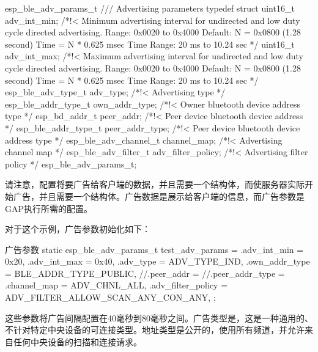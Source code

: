 \documentclass[lang=cn,newtx,10pt,scheme=chinese]{elegantbook}
\begin{document}
\begin{mycode}{esp\_ble\_adv\_params\_t}
/// Advertising parameters
typedef struct {
    uint16_t adv_int_min;
    /*!< Minimum advertising interval for undirected and low duty cycle directed advertising.
                    Range: 0x0020 to 0x4000
                    Default: N = 0x0800 (1.28 second)
                    Time = N * 0.625 msec
                    Time Range: 20 ms to 10.24 sec */
    uint16_t adv_int_max;
    /*!< Maximum advertising interval for undirected and low duty cycle directed advertising.
                    Range: 0x0020 to 0x4000
                    Default: N = 0x0800 (1.28 second)
                    Time = N * 0.625 msec
                    Time Range: 20 ms to 10.24 sec */
    esp_ble_adv_type_t adv_type;            /*!< Advertising type */
    esp_ble_addr_type_t own_addr_type;      /*!< Owner bluetooth device address type */
    esp_bd_addr_t peer_addr;                /*!< Peer device bluetooth device address */
    esp_ble_addr_type_t peer_addr_type;     /*!< Peer device bluetooth device address type */
    esp_ble_adv_channel_t channel_map;      /*!< Advertising channel map */
    esp_ble_adv_filter_t adv_filter_policy; /*!< Advertising filter policy */
}
esp_ble_adv_params_t;
\end{mycode}

请注意，配置将要广告给客户端的数据，并且需要一个结构体，而使服务器实际开始广告，并且需要一个结构体。广告数据是展示给客户端的信息，而广告参数是GAP执行所需的配置。

对于这个示例，广告参数初始化如下：

\begin{mycode}{广告参数}
static esp_ble_adv_params_t test_adv_params = {
    .adv_int_min        = 0x20,
    .adv_int_max        = 0x40,
    .adv_type           = ADV_TYPE_IND,
    .own_addr_type      = BLE_ADDR_TYPE_PUBLIC,
    //.peer_addr        =
    //.peer_addr_type   =
    .channel_map        = ADV_CHNL_ALL,
    .adv_filter_policy  = ADV_FILTER_ALLOW_SCAN_ANY_CON_ANY,
};
\end{mycode}

这些参数将广告间隔配置在40毫秒到80毫秒之间。广告类型是，这是一种通用的、不针对特定中央设备的可连接类型。地址类型是公开的，使用所有频道，并允许来自任何中央设备的扫描和连接请求。
\end{document}
